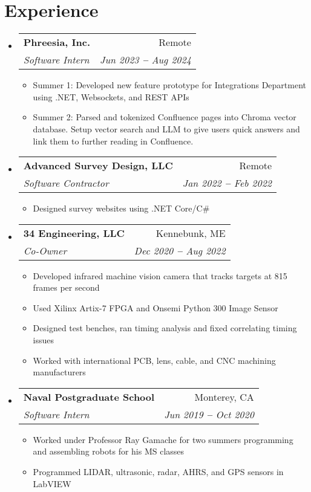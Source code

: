 \documentclass[12pt]{article}
\makeatletter
\newcommand{\entry}[1]{
  \item\small{
    {#1 \vspace{-2pt}}
  }
}
\newcommand{\subheading}[4]{
  \vspace{-2pt}\item
    \begin{tabular*}{0.97\textwidth}[t]{l@{\extracolsep{\fill}}r}
      \textbf{#1} & #2 \\
      \textit{\small#3} & \textit{\small #4} \\
    \end{tabular*}\vspace{-7pt}
}
\newcommand{\subheadingliststart}{\begin{itemize}[leftmargin=0.15in, label={}]}
\newcommand{\subheadinglistend}{\end{itemize}}
\newcommand{\entryliststart}{\begin{itemize}}
\newcommand{\entrylistend}{\end{itemize}\vspace{-5pt}}
\makeatother
\begin{document}
\section{Experience}
  \vspace{3pt}
  \subheadingliststart
    \subheading
      {Phreesia, Inc.}{Remote}
      {Software Intern}{Jun 2023 \textbf{--} Aug 2024}
        \entryliststart
            \entry{Summer 1: Developed new feature prototype for Integrations Department using .NET, Websockets, and REST APIs}
            \entry{Summer 2: Parsed and tokenized Confluence pages into Chroma vector database. Setup vector search and LLM to give users quick answers and link them to further reading in Confluence.}
        \entrylistend
    \subheading
      {Advanced Survey Design, LLC}{Remote}
      {Software Contractor}{Jan 2022 \textbf{--} Feb 2022}
        \entryliststart
            \entry{Designed survey websites using .NET Core/C\#}
        \entrylistend
    \subheading
      {34 Engineering, LLC}{Kennebunk, ME}
      {Co-Owner}{Dec 2020 \textbf{--} Aug 2022}
        \entryliststart
            \entry{Developed infrared machine vision camera that tracks targets at 815 frames per second}
            \entry{Used Xilinx Artix-7 FPGA and Onsemi Python 300 Image Sensor}
            \entry{Designed test benches, ran timing analysis and fixed correlating timing issues}
            \entry{Worked with international PCB, lens, cable, and CNC machining manufacturers}
        \entrylistend
    \subheading
      {Naval Postgraduate School}{Monterey, CA}
      {Software Intern}{Jun 2019 \textbf{--} Oct 2020}
        \entryliststart
            \entry{Worked under Professor Ray Gamache for two summers programming and assembling robots for his MS classes}
            \entry{Programmed LIDAR, ultrasonic, radar, AHRS, and GPS sensors in LabVIEW}
        \entrylistend
  \subheadinglistend

\end{document}
